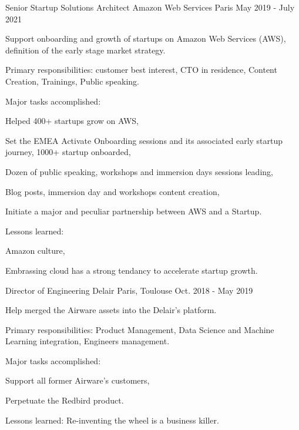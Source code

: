 \begin{cventries}
  \cventry
    {Senior Startup Solutions Architect} %
    {Amazon Web Services} %
    {Paris} %
    {May 2019 - July 2021} %
    {
      \begin{cvitems} %
        \item {Support onboarding and growth of startups on Amazon Web Services (AWS), definition of the early stage market strategy.}
        \item {Primary responsibilities: customer best interest, CTO in residence, Content Creation, Trainings, Public speaking.}
        \item {Major tasks accomplished:}
        \begin{cvsubitems}
          \item {Helped 400+ startups grow on AWS,}
          \item {Set the EMEA Activate Onboarding sessions and its associated early startup journey, 1000+ startup onboarded,}
          \item {Dozen of public speaking, workshops and immersion days sessions leading,}
          \item {Blog posts, immersion day and workshops content creation,}
          \item {Initiate a major and peculiar partnership between AWS and a Startup.}
        \end{cvsubitems}
        \item {Lessons learned:}
        \begin{cvsubitems}
          \item {Amazon culture,}
          \item {Embrassing cloud has a strong tendancy to accelerate startup growth.}
        \end{cvsubitems}
      \end{cvitems}
    }

  \cventry
    {Director of Engineering} %
    {Delair} %
    {Paris, Toulouse} %
    {Oct. 2018 - May 2019} %
    {
      \begin{cvitems} %
        \item {Help merged the Airware assets into the Delair's platform.}
        \item {Primary responsibilities: Product Management, Data Science and Machine Learning integration, Engineers management.}
        \item {Major tasks accomplished:}
        \begin{cvsubitems}
          \item {Support all former Airware's customers,}
          \item {Perpetuate the Redbird product.}
        \end{cvsubitems}
        \item {Lessons learned: Re-inventing the wheel is a business killer.}
      \end{cvitems}
    }


\end{cventries}
